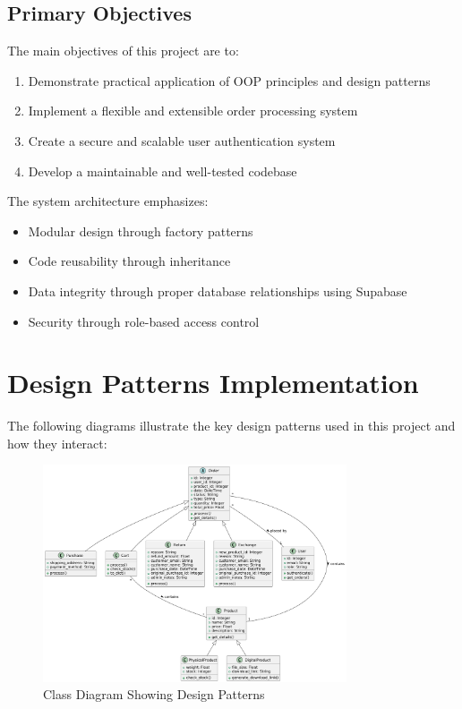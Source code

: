 \documentclass[12pt,a4paper]{article}
\begin{document}
\subsection{Primary Objectives}

The main objectives of this project are to:

\begin{enumerate}
    \item Demonstrate practical application of OOP principles and design patterns
    \item Implement a flexible and extensible order processing system
    \item Create a secure and scalable user authentication system
    \item Develop a maintainable and well-tested codebase
\end{enumerate}

The system architecture emphasizes:
\begin{itemize}
    \item Modular design through factory patterns
    \item Code reusability through inheritance
    \item Data integrity through proper database relationships using Supabase
    \item Security through role-based access control
\end{itemize}
\section{Design Patterns Implementation}
The following diagrams illustrate the key design patterns used in this project and how they interact:

\begin{figure}[H]
    \centering
    \includegraphics[width=0.8\textwidth]{docs/diagrams/class_diagram.png}
    \caption{Class Diagram Showing Design Patterns}
\end{figure}
\end{document}
